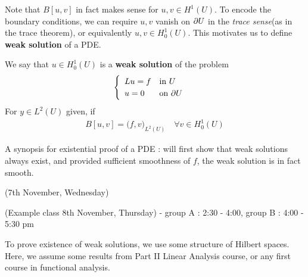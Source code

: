 \documentclass[10pt,a4paper]{report}
\begin{document}
Note that $B[u,v]$ in fact makes sense for $u,v\in H^1(U)$. To encode the boundary conditions, we can require $u,v$ vanish on $\partial U$ in the \emph{trace sense}(as in the trace theorem), or equivalently $u,v \in H_0^1(U)$. This motivates us to define \textbf{weak solution} of a PDE.
\s

 We say that $u\in H^1_0(U)$ is a \textbf{weak solution} of the problem
\begin{align*}
\begin{cases}
\begin{array}{ll}
Lu = f & \text{in } U \\
u =0 & \text{on } \partial U
\end{array}
\end{cases}
\end{align*}
For $y\in L^2(U)$ given, if
\begin{align*}
B[u,v] = \big( f,v \big)_{L^2(U)} \quad \forall v\in H_0^1 (U)
\end{align*}
\s

A synopsis for existential proof of a PDE : will first show that weak solutions always exist, and provided sufficient smoothness of $f$, the weak solution is in fact smooth.
\s

\newday

(7th November, Wednesday)
\s

(Example class 8th November, Thursday) - group A : 2:30 - 4:00, group B : 4:00 - 5:30 pm
\s

To prove existence of weak solutions, we use some structure of Hilbert spaces. Here, we assume some results from Part II Linear Analysis course, or any first course in functional analysis.
\s
\end{document}
